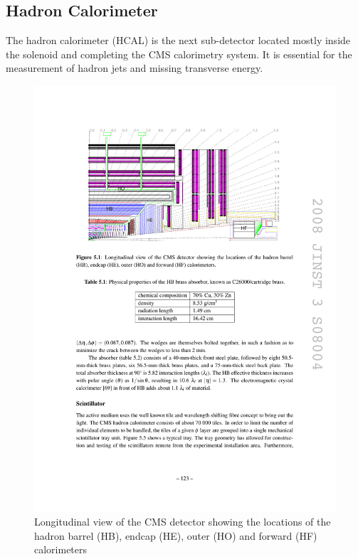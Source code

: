 \subsection{Hadron Calorimeter}

The hadron calorimeter (HCAL) is the next sub-detector located mostly inside the solenoid and completing the CMS
calorimetry system. It is essential for the measurement of hadron jets and missing transverse energy.

\begin{figure}[htbp]
  \centering
  \leavevmode
  \includegraphics[width=\columnwidth]{HCAL}
  \caption{Longitudinal view of the CMS detector showing the locations of the hadron barrel (HB), endcap (HE), outer
  (HO) and forward (HF) calorimeters \autocite{CMS}}
  \label{fig:HCAL}
\end{figure}

